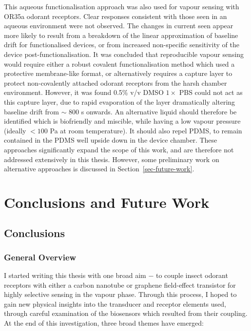 \documentclass[
  a4paper,
]{scrbook}
\begin{document}
This aqueous functionalisation approach was also used for vapour sensing
with OR35a odorant receptors. Clear responses consistent with those seen
in an aqueous environment were not observed. The changes in current seen
appear more likely to result from a breakdown of the linear
approximation of baseline drift for functionalised devices, or from
increased non-specific sensitivity of the device post-functionalisation.
It was concluded that reproducible vapour sensing would require either a
robust covalent functionalisation method which used a protective
membrane-like format, or alternatively requires a capture layer to
protect non-covalently attached odorant receptors from the harsh chamber
environment. However, it was found 0.5\% v/v DMSO \(1 \times\) PBS could
not act as this capture layer, due to rapid evaporation of the layer
dramatically altering baseline drift from \(\sim\) 800 s onwards. An
alternative liquid should therefore be identified which is biofriendly
and miscible, while having a low vapour pressure (ideally \(< 100\) Pa
at room temperature). It should also repel PDMS, to remain contained in
the PDMS well upside down in the device chamber. These approaches
significantly expand the scope of this work, and are therefore not
addressed extensively in this thesis. However, some preliminary work on
alternative approaches is discussed in Section~\ref{sec-future-work}.


\hypertarget{conclusions-and-future-work}{%
\chapter{Conclusions and Future
Work}\label{conclusions-and-future-work}}

\hypertarget{sec-conclusions}{%
\section{Conclusions}\label{sec-conclusions}}

\hypertarget{general-overview-2}{%
\subsection{General Overview}\label{general-overview-2}}

I started writing this thesis with one broad aim \(-\) to couple insect
odorant receptors with either a carbon nanotube or graphene field-effect
transistor for highly selective sensing in the vapour phase. Through
this process, I hoped to gain new physical insights into the transducer
and receptor elements used, through careful examination of the
biosensors which resulted from their coupling. At the end of this
investigation, three broad themes have emerged:
\end{document}
